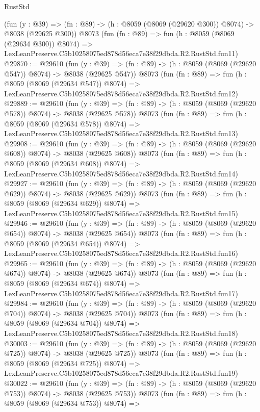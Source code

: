 \begin{lexlean}{RustStd}
\begin{coremodule}
    (fun (y : @39) => (fn : @89) -> (h : @8059 (@8069 (@29620 @300)) @8074) -> @8038 (@29625 @300))
    @8073
    (fun (fn : @89) =>
    fun (h : @8059 (@8069 (@29634 @300)) @8074) =>
    LexLeanPreserve.C5b10258075ed878d56eca7e38f29dbda.R2.RustStd.fun11)
@29870 := @29610
    (fun (y : @39) => (fn : @89) -> (h : @8059 (@8069 (@29620 @547)) @8074) -> @8038 (@29625 @547))
    @8073
    (fun (fn : @89) =>
    fun (h : @8059 (@8069 (@29634 @547)) @8074) =>
    LexLeanPreserve.C5b10258075ed878d56eca7e38f29dbda.R2.RustStd.fun12)
@29889 := @29610
    (fun (y : @39) => (fn : @89) -> (h : @8059 (@8069 (@29620 @578)) @8074) -> @8038 (@29625 @578))
    @8073
    (fun (fn : @89) =>
    fun (h : @8059 (@8069 (@29634 @578)) @8074) =>
    LexLeanPreserve.C5b10258075ed878d56eca7e38f29dbda.R2.RustStd.fun13)
@29908 := @29610
    (fun (y : @39) => (fn : @89) -> (h : @8059 (@8069 (@29620 @608)) @8074) -> @8038 (@29625 @608))
    @8073
    (fun (fn : @89) =>
    fun (h : @8059 (@8069 (@29634 @608)) @8074) =>
    LexLeanPreserve.C5b10258075ed878d56eca7e38f29dbda.R2.RustStd.fun14)
@29927 := @29610
    (fun (y : @39) => (fn : @89) -> (h : @8059 (@8069 (@29620 @629)) @8074) -> @8038 (@29625 @629))
    @8073
    (fun (fn : @89) =>
    fun (h : @8059 (@8069 (@29634 @629)) @8074) =>
    LexLeanPreserve.C5b10258075ed878d56eca7e38f29dbda.R2.RustStd.fun15)
@29946 := @29610
    (fun (y : @39) => (fn : @89) -> (h : @8059 (@8069 (@29620 @654)) @8074) -> @8038 (@29625 @654))
    @8073
    (fun (fn : @89) =>
    fun (h : @8059 (@8069 (@29634 @654)) @8074) =>
    LexLeanPreserve.C5b10258075ed878d56eca7e38f29dbda.R2.RustStd.fun16)
@29965 := @29610
    (fun (y : @39) => (fn : @89) -> (h : @8059 (@8069 (@29620 @674)) @8074) -> @8038 (@29625 @674))
    @8073
    (fun (fn : @89) =>
    fun (h : @8059 (@8069 (@29634 @674)) @8074) =>
    LexLeanPreserve.C5b10258075ed878d56eca7e38f29dbda.R2.RustStd.fun17)
@29984 := @29610
    (fun (y : @39) => (fn : @89) -> (h : @8059 (@8069 (@29620 @704)) @8074) -> @8038 (@29625 @704))
    @8073
    (fun (fn : @89) =>
    fun (h : @8059 (@8069 (@29634 @704)) @8074) =>
    LexLeanPreserve.C5b10258075ed878d56eca7e38f29dbda.R2.RustStd.fun18)
@30003 := @29610
    (fun (y : @39) => (fn : @89) -> (h : @8059 (@8069 (@29620 @725)) @8074) -> @8038 (@29625 @725))
    @8073
    (fun (fn : @89) =>
    fun (h : @8059 (@8069 (@29634 @725)) @8074) =>
    LexLeanPreserve.C5b10258075ed878d56eca7e38f29dbda.R2.RustStd.fun19)
@30022 := @29610
    (fun (y : @39) => (fn : @89) -> (h : @8059 (@8069 (@29620 @753)) @8074) -> @8038 (@29625 @753))
    @8073
    (fun (fn : @89) =>
    fun (h : @8059 (@8069 (@29634 @753)) @8074) =>

\end{coremodule}
\end{lexlean}
